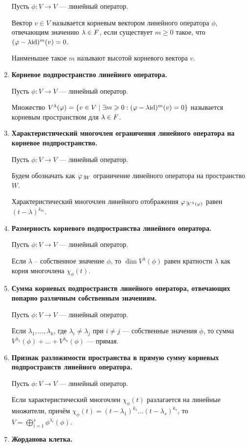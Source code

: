 \begin{enumerate}
Пусть $\phi\colon V \rightarrow V$ --- линейный оператор.

Вектор $v \in V$ называется корневым вектором линейного оператора $\phi$, отвечающим значению $\lambda \in F$, если существует $m \geqslant 0$ такое, что $(\varphi - \lambda\mathrm{id})^m(v) = 0$.

Наименьшее такое $m$ называют высотой корневого вектора $v$.
\item \textbf{Корневое подпространство линейного оператора.}

Пусть $\phi\colon V \rightarrow V$ --- линейный оператор.

Множество $V^\lambda(\varphi) = \{ v \in V \mid \exists m \geqslant 0  : (\varphi - \lambda\mathrm{id})^m(v) = 0 \}$ называется корневым пространством для $\lambda \in F$.
\item \textbf{Характеристический многочлен ограничения линейного оператора на корневое подпространство.}

Пусть $\phi\colon V \rightarrow V$ --- линейный оператор.

Будем обозначать как $\phi \; \vline_{W}$ ограничение линейного оператора на пространство $W$.

Характеристический многочлен линейного отображения $\phi \; \vline_{V^{\lambda}(\phi)}$ равен $(t - \lambda)^{k_m}$.
\item \textbf{Размерность корневого подпространства линейного оператора.}

Пусть $\phi\colon V \rightarrow V$ --- линейный оператор.

Если $\lambda$ -- собственное значение $\phi$, то $\dim{V^{\lambda}(\phi)}$ равен кратности 
	$\lambda$ как корня многочлена $\chi_\phi(t)$.
\item \textbf{Сумма корневых подпространств линейного оператора, отвечающих попарно различным собственным значениям.}

Пусть $\phi\colon V \rightarrow V$ --- линейный оператор.

Если $\lambda_1, \ldots, \lambda_k$, где $\lambda_i \neq \lambda_j$ при $i \neq j$ --- собственные значения $\phi$, то сумма $V^{\lambda_1}(\phi) + \ldots + V^{\lambda_k}(\phi)$ --- прямая.
\item \textbf{Признак разложимости пространства в прямую сумму корневых подпространств линейного оператора.}

Пусть $\phi\colon V \rightarrow V$ --- линейный оператор.

Если характеристический многочлен $\chi_\phi(t)$ разлагается на линейные множители, причём $\chi_\phi(t) = (t - \lambda_1)^{k_1}\ldots(t - \lambda_s)^{k_s}$, то $V = \bigoplus_{i = 1}^s  \phi^{\lambda_i}(\phi)$.
\item \textbf{Жорданова клетка.}


\end{enumerate}
